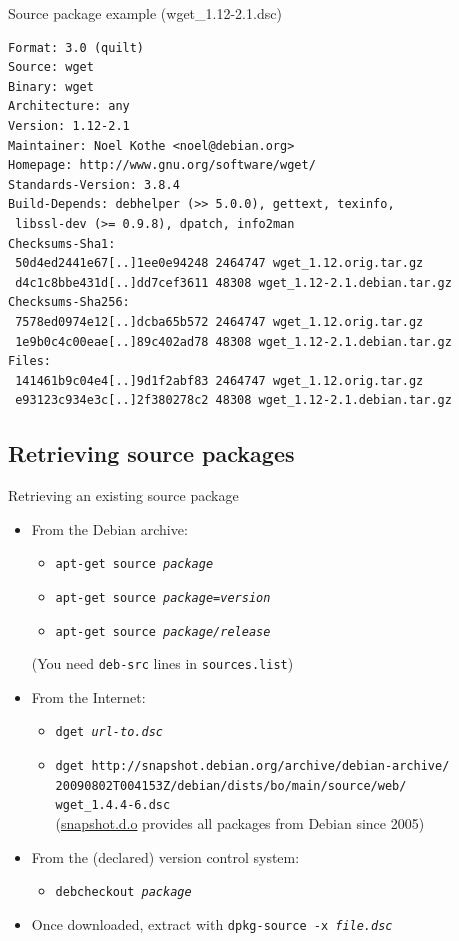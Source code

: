 \documentclass[10pt,final]{beamer}
\begin{document}
\begin{frame}[fragile=singleslide]{Source package example (wget\_1.12-2.1.dsc)}
  \begin{lstlisting}[basicstyle=\ttfamily\small]
Format: 3.0 (quilt)
Source: wget
Binary: wget
Architecture: any
Version: 1.12-2.1
Maintainer: Noel Kothe <noel@debian.org>
Homepage: http://www.gnu.org/software/wget/
Standards-Version: 3.8.4
Build-Depends: debhelper (>> 5.0.0), gettext, texinfo,
 libssl-dev (>= 0.9.8), dpatch, info2man
Checksums-Sha1: 
 50d4ed2441e67[..]1ee0e94248 2464747 wget_1.12.orig.tar.gz
 d4c1c8bbe431d[..]dd7cef3611 48308 wget_1.12-2.1.debian.tar.gz
Checksums-Sha256: 
 7578ed0974e12[..]dcba65b572 2464747 wget_1.12.orig.tar.gz
 1e9b0c4c00eae[..]89c402ad78 48308 wget_1.12-2.1.debian.tar.gz
Files: 
 141461b9c04e4[..]9d1f2abf83 2464747 wget_1.12.orig.tar.gz
 e93123c934e3c[..]2f380278c2 48308 wget_1.12-2.1.debian.tar.gz
\end{lstlisting}
\end{frame}

\subsection{Retrieving source packages}
\begin{frame}{Retrieving an existing source package}
  \begin{itemize}
  \item From the Debian archive:
    \begin{itemize}
    \item \texttt{apt-get source \textsl{package}}
    \item \texttt{apt-get source \textsl{package=version}}
    \item \texttt{apt-get source \textsl{package/release}}
    \end{itemize}
    (You need \texttt{deb-src} lines in \texttt{sources.list})
    \br
  \item From the Internet:
    \begin{itemize}
    \item \texttt{dget \textsl{url-to.dsc}}
    \item \texttt{dget http://snapshot.debian.org/archive/debian-archive/\\20090802T004153Z/debian/dists/bo/main/source/web/\\
        wget\_1.4.4-6.dsc}\\ 
      (\href{http://snapshot.debian.org/}{\ttfamily snapshot.d.o} provides all packages from Debian since 2005)
    \end{itemize}
    \br
  \item From the (declared) version control system:
    \begin{itemize}
    \item \texttt{debcheckout \textsl{package}}
    \end{itemize}
    \br
  \item Once downloaded, extract with \texttt{dpkg-source -x \textsl{file.dsc}}
  \end{itemize}
\end{frame}
\end{document}
